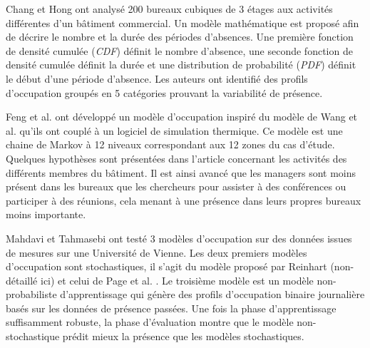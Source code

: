 Chang et Hong \cite{Chang-14} ont analysé 200 bureaux cubiques de 3 étages aux activités différentes d'un bâtiment commercial. Un modèle mathématique est proposé afin de décrire le nombre et la durée des périodes d'absences. Une première fonction de densité cumulée (\textit{CDF}) définit le nombre d'absence, une seconde fonction de densité cumulée définit la durée et une distribution de probabilité (\textit{PDF}) définit le début d'une période d'absence. Les auteurs ont identifié des profils d'occupation groupés en 5 catégories prouvant la variabilité de présence.

Feng et al. \cite{Feng-15} ont développé un modèle d'occupation inspiré du modèle de Wang et al. \cite{Wang-11} qu'ils ont couplé à un logiciel de simulation thermique. Ce modèle est une chaine de Markov à 12 niveaux correspondant aux 12 zones du cas d'étude. Quelques hypothèses sont présentées dans l'article concernant les activités des différents membres du bâtiment. Il est ainsi avancé que les managers sont moins présent dans les bureaux que les chercheurs pour assister à des conférences ou participer à des réunions, cela menant à une présence dans leurs propres bureaux moins importante.

Mahdavi et Tahmasebi \cite{Mahdavi-15} ont testé 3 modèles d'occupation sur des données issues de mesures sur une Université de Vienne. Les deux premiers modèles d'occupation sont stochastiques, il s'agit du modèle proposé par Reinhart \cite{Reinhart-01} (non-détaillé ici) et celui de Page et al. \cite{Page-08}. Le troisième modèle est un modèle non-probabiliste d'apprentissage qui génère des profils d'occupation binaire journalière basés sur les données de présence passées. Une fois la phase d'apprentissage suffisamment robuste, la phase d'évaluation montre que le modèle non-stochastique prédit mieux la présence que les modèles stochastiques.

